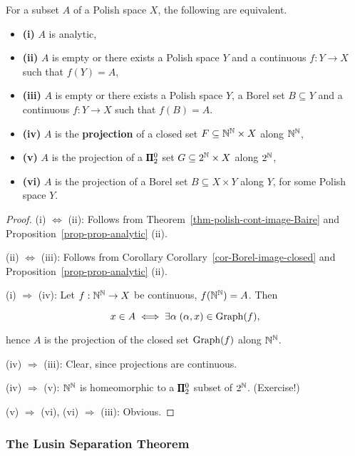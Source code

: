 \begin{proposition}\label{characterization-analytic}For a subset $A$ of a Polish space $X$, the following are equivalent.

\begin{itemize}
\item \textbf{(i)} $A$ is analytic,
\item \textbf{(ii)} $A$ is empty or there exists a Polish space $Y$ and a continuous $f:Y \to X$ such that $f(Y) = A$,
\item \textbf{(iii)} $A$ is empty or there exists a Polish space $Y$, a Borel set $B \subseteq Y$ and a continuous $f:Y \to X$ such that $f(B) = A$.
\item \textbf{(iv)} $A$ is the \textbf{projection} of a closed set $F \subseteq \mathbb{N}^{\mathbb{N}} \times X$ along $\mathbb{N}^{\mathbb{N}}$,
\item \textbf{(v)} $A$ is the projection of a $\pmb{\Pi}^0_{2}$ set $G \subseteq  2^{\mathbb{N}} \times   X$ along $2^{\mathbb{N}}$,
\item \textbf{(vi)} $A$ is the projection of a Borel set $B \subseteq X\times Y$ along $Y$, for some Polish space $Y$.
\end{itemize}

\end{proposition}\begin{proof}(i) $\Leftrightarrow$ (ii): Follows from Theorem~\ref{thm-polish-cont-image-Baire} and Proposition~\ref{prop-prop-analytic} (ii).

(ii) $\Leftrightarrow$ (iii): Follows from Corollary Corollary~\ref{cor-Borel-image-closed} and Proposition~\ref{prop-prop-analytic} (ii).

(i) $\Rightarrow$ (iv):  Let $f:\mathbb{N}^{\mathbb{N}} \to X$ be continuous, $f(\mathbb{N}^{\mathbb{N}}) = A$. Then

\begin{equation}
x \in A \iff \exists \alpha \; (\alpha,x) \in \operatorname{Graph}(f),
\end{equation}

hence $A$ is the projection of the closed set $\operatorname{Graph}(f)$ along $\mathbb{N}^{\mathbb{N}}$.

(iv) $\Rightarrow$ (iii): Clear, since projections are continuous.

(iv) $\Rightarrow$ (v): $\mathbb{N}^{\mathbb{N}}$ is homeomorphic to a $\pmb{\Pi}^0_{2}$ subset of $2^{\mathbb{N}}$. (Exercise!)

(v) $\Rightarrow$ (vi), (vi) $\Rightarrow$ (iii): Obvious.

\end{proof}\subsubsection{The Lusin Separation Theorem}

